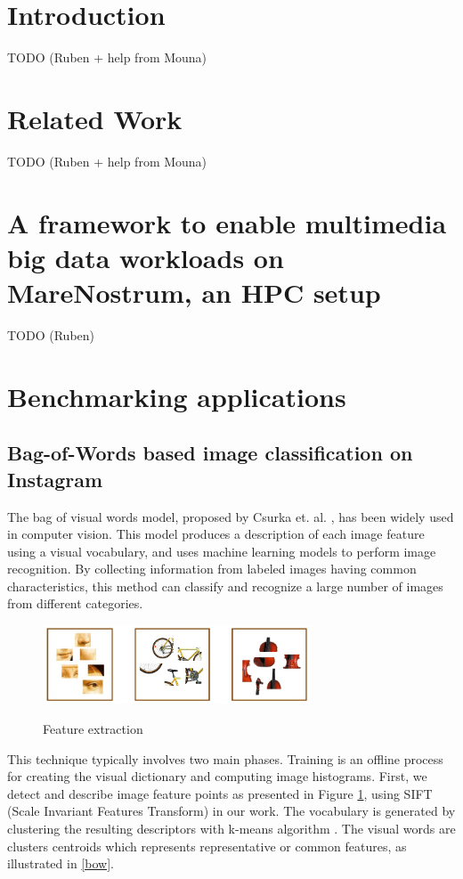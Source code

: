 \documentclass[smallextended]{svjour3}       %
\begin{document}
\section{Introduction}
\label{intro}

TODO (Ruben + help from Mouna)

\section{Related Work}
\label{sec:rw}

TODO (Ruben + help from Mouna)

\section{A framework to enable multimedia big data workloads on MareNostrum, an HPC setup}
\label{sec:spark4mn}

TODO (Ruben)

\section{Benchmarking applications}
\label{sec:exps1}

\subsection{Bag-of-Words based image classification on Instagram}
The bag of visual words model, proposed by Csurka et. al. \cite{bowe}, has been widely used in computer vision. This model produces a description of  each image feature using a visual vocabulary, and uses machine learning models to perform image recognition. By collecting information from labeled images having common characteristics, this method can classify and recognize a large number of images from different categories. 

\begin{figure}[!h]
\centering
\includegraphics[width=8cm]{img/feature}
\label{sift}
\caption{Feature extraction \cite{200512Robert_Fergus}}
\end{figure}

This technique typically involves two main phases. Training is an offline process for creating the visual dictionary and computing image histograms. First, we detect and describe image feature points as presented in Figure \ref{sift}, using SIFT (Scale Invariant Features Transform) \cite{sift} in our work. The vocabulary is generated by clustering the resulting descriptors with k-means algorithm \cite{kmeans}. The visual words are clusters centroids which represents representative or common features, as illustrated in \ref{bow}. 
\end{document}
